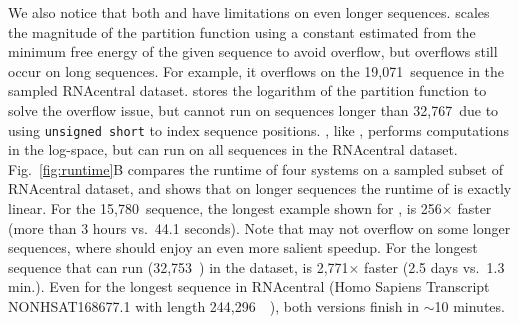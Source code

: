 We also notice that both \rnafold and \contrafold have limitations on even longer sequences.
\rnafold scales the magnitude of the partition function 
using a constant estimated from the minimum free energy of the given sequence to avoid overflow,
but overflows still occur 
on long sequences.
For example, it overflows %
on the 19,071~\nts sequence in the sampled RNAcentral dataset.
\contrafold stores the logarithm of the partition function to solve the overflow issue,
but cannot run on sequences longer than 32,767~\nts due to using {\tt unsigned short}
to index sequence positions.
\linearpartition, like \contrafold, performs computations in the log-space,
but can run on all sequences in the RNAcentral dataset.
Fig.~\ref{fig:runtime}B compares the runtime of four systems on a sampled subset of RNAcentral dataset,
and shows that %
on longer sequences the runtime of \linearpartition is exactly linear.
For the 15,780~\nts sequence, 
the longest example shown for \rnafold, %
\linearpartitionv is 256$\times$ faster (more than 3 hours vs.~44.1 seconds). 
Note that \rnafold may not overflow on some longer sequences, 
where \linearpartitionv should enjoy an even more salient speedup.
For the longest sequence that \contrafold can run (32,753~\nts) in the dataset,
\linearpartition is 2,771$\times$ faster (2.5 days vs.~1.3 min.).
Even for the longest sequence in RNAcentral
(Homo Sapiens Transcript NONHSAT168677.1 with length 244,296~\nts~\cite{Zhao+:2016}),
both \linearpartition versions finish in $\sim$10 minutes.

